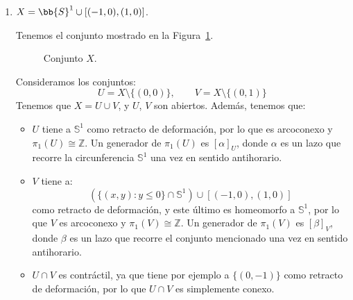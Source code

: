 \begin{ejercicio}
\begin{enumerate}[label=\alph*)]
            Además, como unión de dos conjuntos arcoconexos con intersección no vacía, $X$ es arcoconexo.
            
            Observemos que un razonamiento similar puede hacerse para el caso de $n$ circunferencias de forma que la intersección dos a dos de ellas es unitaria, obteniendo que el grupo fundamental de la unión de dichas $n$ circunferencias sería $\overset{n}{\underset{i=1}{\ast}} \bb{Z}$.
        \item $X = \bb{S}^1\cup [(-1,0), (1,0)]$.

            Tenemos el conjunto mostrado en la Figura~\ref{fig:conjuntoX_I}.
            \begin{figure}[h]
                \centering
                \caption{Conjunto $X$.}
                \label{fig:conjuntoX_I}
            \end{figure}
            Consideramos los conjuntos:
            \begin{equation*}
                U = X\setminus \{(0,0)\}, \qquad V = X\setminus \{(0,1)\}
            \end{equation*}
            Tenemos que $X=U\cup V$, y $U$, $V$ son abiertos. Además, tenemos que:
            \begin{itemize}
                \item $U$ tiene a $\mathbb{S}^1$ como retracto de deformación, por lo que es arcoconexo y $\pi_1(U)\cong \mathbb{Z}$. Un generador de $\pi_1(U)$ es $[\alpha]_U$, donde $\alpha$ es un lazo que recorre la circunferencia $\mathbb{S}^1$ una vez en sentido antihorario.
                \item $V$ tiene a:
                    \begin{equation*}
                        (\{(x,y):y\leq 0\}\cap \mathbb{S}^1)\cup [(-1,0),(1,0)]
                    \end{equation*}
                    como retracto de deformación, y este último es homeomorfo a $\mathbb{S}^1$, por lo que $V$ es arcoconexo y $\pi_1(V)\cong \mathbb{Z}$. Un generador de $\pi_1(V)$ es $[\beta]_V$, donde $\beta$ es un lazo que recorre el conjunto mencionado una vez en sentido antihorario.
                \item $U\cap V$ es contráctil, ya que tiene por ejemplo a $\{(0,-1)\}$ como retracto de deformación, por lo que $U\cap V$ es simplemente conexo.
            \end{itemize}


\end{enumerate}
\end{ejercicio}
